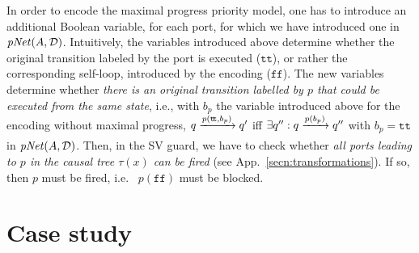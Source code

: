 \documentclass{llncs}
\newcommand{\app}[1]{App.~\ref{secn:#1}}
\newcommand{\cD}{\ensuremath{\mathcal{D}}}
\newcommand{\ie}[1][\ ]{i.e.#1}
\newcommand{\goesto}[2][]{\ensuremath{\xrightarrow[{#1}\relax]{#2}}}
\newcommand{\true} {\ensuremath{\mathtt{t\!t}}}
\newcommand{\false}{\ensuremath{\mathtt{f\!f}}}
\newcommand{\nopri}[1][]{\ensuremath{\mathit{pNet}%
    \ifx#1\relax\else(#1)\fi}}
\newcommand{\partition}{\cD}
\begin{document}
\bigskip
In order to encode the maximal progress priority model, one has to
introduce an additional Boolean variable, for each port, for which we
have introduced one in $\nopri[A, \partition]$.  Intuitively, the
variables introduced above determine whether the original transition
labeled by the port is executed (\true), or rather the corresponding
self-loop, introduced by the encoding (\false).  The new variables
determine whether \emph{there is an original transition labelled by
  $p$ that could be executed from the same state}, \ie[,] with $b_p$
the variable introduced above for the encoding without maximal
progress, $q \goesto{p(\true, b_p)} q'$ iff $\exists q'': q
\goesto{p(b_p)} q''$ with $b_p = \true$ in $\nopri[A, \partition]$.
Then, in the SV guard, we have to check whether \emph{all ports
  leading to $p$ in the causal tree $\tau(x)$ can be fired} (see
\app{transformations}).  If so, then $p$ must be fired, \ie
$p(\false)$ must be blocked.  %




\section{Case study}
\label{secn:case-study}



\label{secn:arch:verif}

\end{document}
